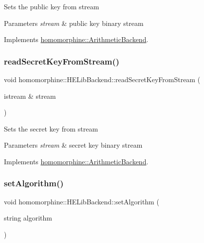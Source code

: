 Sets the public key from stream


\begin{DoxyParams}{Parameters}
{\em stream} & public key binary stream \\
\hline
\end{DoxyParams}


Implements \mbox{\hyperlink{classhomomorphine_1_1_arithmetic_backend_aab5aac202ce0911e99e8adce7ffb707a}{homomorphine\+::\+Arithmetic\+Backend}}.

\mbox{\label{classhomomorphine_1_1_h_e_lib_backend_ad1ed1336d11c5b75419efa58aa9071e3}} 
\subsubsection{\texorpdfstring{readSecretKeyFromStream()}{readSecretKeyFromStream()}}
{\footnotesize\ttfamily void homomorphine\+::\+H\+E\+Lib\+Backend\+::read\+Secret\+Key\+From\+Stream (\begin{DoxyParamCaption}\item[{istream \&}]{stream }\end{DoxyParamCaption})\hspace{0.3cm}{\ttfamily [virtual]}}

Sets the secret key from stream


\begin{DoxyParams}{Parameters}
{\em stream} & secret key binary stream \\
\hline
\end{DoxyParams}


Implements \mbox{\hyperlink{classhomomorphine_1_1_arithmetic_backend_a69b65cd979de00a9afa0c38c3b4329b0}{homomorphine\+::\+Arithmetic\+Backend}}.

\mbox{\label{classhomomorphine_1_1_h_e_lib_backend_a39478377b0e299fd90f5c7bb6c8efe89}} 
\subsubsection{\texorpdfstring{setAlgorithm()}{setAlgorithm()}}
{\footnotesize\ttfamily void homomorphine\+::\+H\+E\+Lib\+Backend\+::set\+Algorithm (\begin{DoxyParamCaption}\item[{string}]{algorithm }\end{DoxyParamCaption})\hspace{0.3cm}{\ttfamily [virtual]}}

